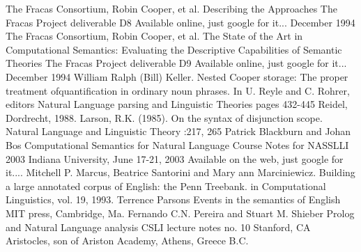 \documentclass{book}[9pt]
\begin{document}
\begin{thebibliography}{1}
\newblock The Fracas Consortium, Robin Cooper, et al.
\newblock Describing the Approaches
\newblock The Fracas Project deliverable D8
\newblock Available online, just google for it...
\newblock December 1994
\newblock The Fracas Consortium, Robin Cooper, et al.
\newblock The State of the Art in Computational Semantics:
\newblock Evaluating the Descriptive Capabilities of Semantic Theories
\newblock The Fracas Project deliverable D9
\newblock Available online, just google for it...
\newblock December 1994
\newblock William Ralph (Bill) Keller.
\newblock Nested Cooper storage: The proper treatment ofquantification in ordinary noun phrases.
\newblock In U. Reyle and C. Rohrer, editors
\newblock Natural Language parsing and Linguistic Theories
\newblock pages 432-445
\newblock Reidel, Dordrecht, 1988.
\newblock Larson, R.K. (1985).  On the syntax of disjunction scope.
\newblock Natural Language and Linguistic Theory
:217, 265
\newblock Patrick Blackburn and Johan Bos
\newblock Computational Semantics for Natural Language
\newblock Course Notes for NASSLLI 2003
\newblock Indiana University, June 17-21, 2003
\newblock Available on the web, just google for it....
\newblock Mitchell P. Marcus,  Beatrice Santorini and Mary ann Marciniewicz.
\newblock Building a large annotated corpus of English: the Penn Treebank.
\newblock in Computational Linguistics, vol. 19, 1993.
\newblock Terrence Parsons
\newblock Events in the semantics of English
\newblock MIT press, Cambridge, Ma.
\newblock Fernando C.N. Pereira and Stuart M. Shieber
\newblock Prolog and Natural Language analysis
\newblock CSLI lecture notes no. 10
\newblock Stanford, CA
\newblock Aristocles, son of Ariston
\newblock Academy, Athens, Greece
 B.C.
\end{thebibliography}
\end{document}
